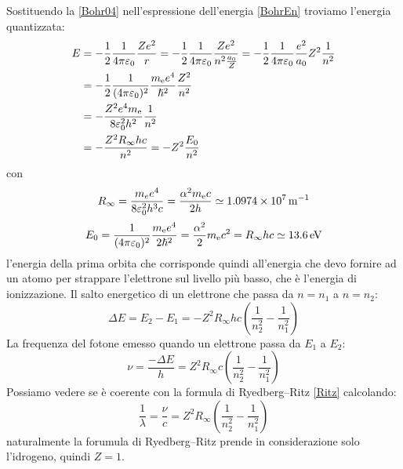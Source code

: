 Sostituendo la \eqref{Bohr04} nell'espressione dell'energia \eqref{BohrEn} troviamo l'energia quantizzata:
\begin{equation}
	\begin{split}
		E&=-\frac{1}{2}\frac{1}{4\pi\varepsilon_0}\frac{Ze^2}{r}=-\frac{1}{2}\frac{1}{4\pi\varepsilon_0}\frac{Ze^2}{n^2\frac{a_0}{Z}}=-\frac{1}{2}\frac{1}{4\pi\varepsilon_0}\frac{e^2}{a_0}Z^2\frac{1}{n^2}\\
		&=-\frac{1}{2}\frac{1}{(4\pi\varepsilon_0)^2}\frac{m_{\mathrm{e}}e^4}{\hslash^2}\frac{Z^2}{n^2}\\
		&=-\frac{Z^2e^4m_\mathrm{e}}{8\varepsilon_0^2h^2}\frac{1}{n^2}\\
		&=-\frac{Z^2R_\infty hc}{n^2}=-Z^2\frac{E_0}{n^2}
	\end{split}
\end{equation}
con
\begin{equation}
	R_\infty=\frac{m_e e^4}{8\varepsilon_0^2h^3 c}=\frac{\alpha^2m_\mathrm{e}c}{2h}\simeq \SI{1.0974E7}{\per\metre}
\end{equation}
\begin{equation}
	E_0=\frac{1}{(4\pi\varepsilon_0)^2}\frac{m_{\mathrm{e}}e^4}{2\hslash^2}=\frac{\alpha^2}{2}m_\mathrm{e}c^2=R_\infty hc\simeq \SI{13.6}{\electronvolt}
\end{equation}
l'energia della prima orbita che corrisponde quindi all'energia che devo fornire ad un atomo per strappare l'elettrone sul livello più basso, che è l'energia di ionizzazione. Il salto energetico di un elettrone che passa da $n=n_1$ a $n=n_2$:
\begin{equation}
		\Delta E=E_2-E_1=-Z^2R_\infty hc\left(\frac{1}{n_2^2}-\frac{1}{n_1^2}\right)
\end{equation}
La frequenza del fotone emesso quando un elettrone passa da $E_1$ a $E_2$:
\begin{equation}
	\nu=\frac{-\Delta E}{h}={Z^2R_\infty c}\left(\frac{1}{n_2^2}-\frac{1}{n_1^2}\right)
\end{equation}
Possiamo vedere se è coerente con la formula di Ryedberg--Ritz \eqref{Ritz} calcolando:
\begin{equation}
	\frac{1}{\lambda}=\frac{\nu}{c}=Z^2R_\infty\left(\frac{1}{n_2^2}-\frac{1}{n_1^2}\right)
\end{equation}
naturalmente la forumula di Ryedberg--Ritz prende in considerazione solo l'idrogeno, quindi $Z=1$.
